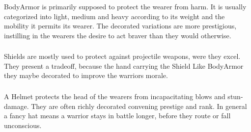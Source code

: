 \subsubsection{}\label{ch:Goods:Armory:Armor:BodyArmor}

\Gls*{BodyArmor} is primarily supposed to protect the wearer from harm. It is usually
categorized into light, medium and heavy according to its weight and the
mobility it permits its wearer. The decorated variations are more prestigious,
instilling in the wearers the desire to act braver than they would otherwise.

\subsubsection{}\label{ch:Goods:Armory:Armor:Shield}

\Glspl*{Shield} are mostly used to protect against projectile weapons, were they excel.
They present a tradeoff, because the hand carrying the \gls*{Shield}
Like \gls{BodyArmor} they maybe decorated to improve the warriors morale.

\subsubsection{}\label{ch:Goods:Armory:Armor:Helmet}

A \gls*{Helmet} protects the head of the wearers from incapacitating blows and
stun-damage. They are often richly decorated convening prestige and rank. In
general a fancy hat means a warrior stays in battle longer, before they route
or fall unconscious.
